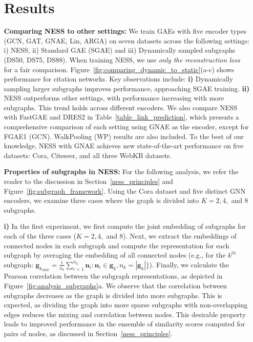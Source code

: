 \documentclass{article}
\begin{document}
\section{Results}\label{results}
\textbf{Comparing NESS to other settings:} We train GAEs with five encoder types (GCN, GAT, GNAE, Lin, ARGA) on seven datasets across the following settings: i) NESS, ii) Standard GAE (SGAE) and iii) Dynamically sampled subgraphs (DS50, DS75, DS88). When training NESS, we use \textit{only the reconstruction loss} for a fair comparison. Figure~\ref{fig:comparing_dynamic_to_static}(a-c) shows performance for citation networks. Key observations include: \textbf{i)} Dynamically sampling larger subgraphs improves performance, approaching SGAE training. \textbf{ii)} NESS outperforms other settings, with performance increasing with more subgraphs. This trend holds across different encoders. We also compare NESS with FastGAE and DRES2 in Table~\ref{table_link_prediction}, which presents a comprehensive comparison of each setting using GNAE as the encoder, except for FGAE1 (GCN). WalkPooling (WP) results are also included. To the best of our knowledge, NESS with GNAE achieves new state-of-the-art performance on five datasets: Cora, Citeseer, and all three WebKB datasets.


\textbf{Properties of subgraphs in NESS:}
For the following analysis, we refer the reader to the discussion in Section~\ref{ness_principles} and Figure~\ref{fig:subgraph_framework}. Using the Cora dataset and five distinct GNN encoders, we examine three cases where the graph is divided into $K=2, 4,$ and $8$ subgraphs.

\textbf{i)} In the first experiment, we first compute the joint embedding of subgraphs for each of the three cases ($K=2, 4,$ and $8$). Next, we extract the embeddings of connected nodes in each subgraph and compute the representation for each subgraph by averaging the embedding of all connected nodes (e.g., for the $k^{th}$ subgraph: ${\bm{g}_k}_{ave} = \frac{1}{n_k}\sum_{i=1}^{n_k} \bm{n}_i : \bm{n}_i \in \bm{g}_k,  n_k=|\bm{g}_k| \}$). Finally, we calculate the Pearson correlation between the subgraph representations, as depicted in Figure~\ref{fig:analysis_subgraphs}a. We observe that the correlation between subgraphs decreases as the graph is divided into more subgraphs. This is expected, as dividing the graph into more sparse subgraphs with non-overlapping edges reduces the mixing and correlation between nodes. This desirable property leads to improved performance in the ensemble of similarity scores computed for pairs of nodes, as discussed in Section~\ref{ness_principles}.
\end{document}
